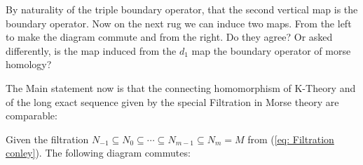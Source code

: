 \begin{corollary}
\begin{fdiagram}
	\end{fdiagram}
	
	
	By naturality of the triple boundary operator, that the second vertical map is the boundary operator. Now on the next rug we can induce two maps. From the left to make the diagram commute and from the right. Do they agree? Or asked differently, is the map induced from the $d_1$ map the boundary operator of morse homology?
\end{corollary}


The Main statement now is that the connecting homomorphism of K-Theory and of the long exact sequence given by the special Filtration in Morse theory are comparable: 
\begin{theorem} \label{thm: commuting connecting homomorphism}
	Given the filtration $N_{-1}\subseteq N_0 \subseteq \cdots \subseteq N_{m-1} \subseteq N_m=M$   from (\ref{eq: Filtration conley}).  The following diagram commutes:
	\begin{center}
	\end{center}
\end{theorem}
